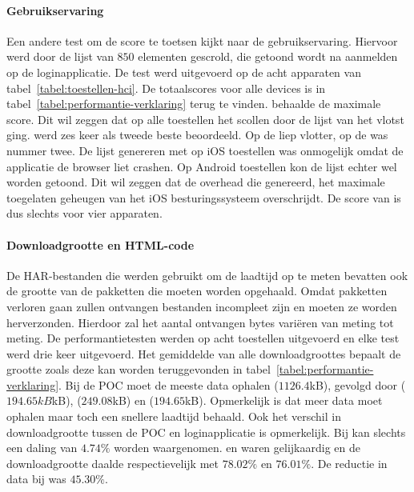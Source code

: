 \paragraph{Gebruikservaring}
Een andere test om de score te toetsen kijkt naar de gebruikservaring.
Hiervoor werd door de lijst van $850$ elementen gescrold, die getoond wordt na aanmelden op de loginapplicatie.
De test werd uitgevoerd op de acht apparaten van tabel~\ref{tabel:toestellen-hci}.
De totaalscores voor alle devices is in tabel~\ref{tabel:performantie-verklaring} terug te vinden.
\st{} behaalde de maximale score.
Dit wil zeggen dat op alle toestellen het scollen door de lijst van \st{} het vlotst ging.
\jqm{} werd zes keer als tweede beste beoordeeld. 
Op de \htc{} liep \kendo{} vlotter,  op de \ipadi{} was \lungo{} nummer twee.
De lijst genereren met \kendo{} op iOS toestellen was onmogelijk omdat de applicatie de browser liet crashen.
Op Android toestellen kon de \kendo{} lijst echter wel worden getoond.
Dit wil zeggen dat de overhead die \kendo{} genereerd, het maximale toegelaten geheugen van het iOS besturingssysteem overschrijdt.
De score van \kendo{} is dus slechts voor vier apparaten.


\paragraph{Downloadgrootte en HTML-code}
De HAR-bestanden die werden gebruikt om de laadtijd op te meten bevatten ook de grootte van de pakketten die moeten worden opgehaald.
Omdat pakketten verloren gaan zullen ontvangen bestanden incompleet zijn en moeten ze worden herverzonden. %
Hierdoor zal het aantal ontvangen bytes variëren van meting tot meting.
De performantietesten werden op acht toestellen uitgevoerd en elke test werd drie keer uitgevoerd.
Het gemiddelde van alle downloadgroottes bepaalt de grootte zoals deze kan worden teruggevonden in tabel~\ref{tabel:performantie-verklaring}.
Bij de POC moet \st{} de meeste data ophalen ($1126.4$kB),  gevolgd door \kendo{} ($194.65kB$kB), \lungo{} ($249.08$kB) en \jqm{} ($194.65$kB).
Opmerkelijk is dat \lungo{} meer data moet ophalen maar toch een snellere laadtijd behaald.
Ook het verschil in downloadgrootte tussen de POC en loginapplicatie is opmerkelijk.
Bij \jqm{} kan slechts een daling van $4.74\%$ worden waargenomen.
\st{} en \lungo{} waren gelijkaardig en de downloadgrootte daalde respectievelijk met $78.02\%$ en $76.01\%$.
De reductie in data bij \kendo{} was $45.30\%$.

